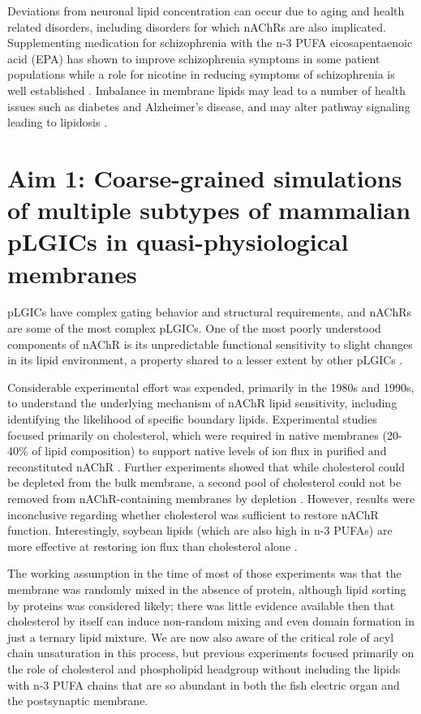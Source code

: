 \documentclass{article}
\begin{document}
Deviations from neuronal lipid concentration can occur due to aging and health related disorders, including disorders for which nAChRs are also implicated. Supplementing medication for schizophrenia with the n-3 PUFA eicosapentaenoic acid (EPA) has shown to improve schizophrenia symptoms in some patient populations \cite{Peet2003,Freemantle2006,Su2003} while a role for nicotine in reducing symptoms of schizophrenia is well established \cite{Picciotto2008}. Imbalance in membrane lipids may lead to a number of health issues such as diabetes and Alzheimer’s disease, and may alter pathway signaling leading to lipidosis \cite{Escriba2017,Laforet2010,Yadav2014}.

\section{Aim 1: Coarse-grained simulations of multiple subtypes of mammalian pLGICs in quasi-physiological membranes}

pLGICs have complex gating behavior and structural requirements, and nAChRs are some of the most complex pLGICs. One of the most poorly understood components of nAChR is its unpredictable functional sensitivity to slight changes in its lipid environment, a property shared to a lesser extent by other pLGICs \cite{M.CriadoH.Eibl1982,Conti2013}.

Considerable experimental effort \cite{Fong_Correlation_1986,Sunshine_Lipid_1992,Hamouda_Assessing_2006,Butler_FTIR_1993,Bhushan_Correlation_1993,Fong_Stabilization_1987,Corrie_Lipid_2002} was expended, primarily in the 1980s and 1990s, to understand the underlying mechanism of nAChR lipid sensitivity, including identifying the likelihood of specific boundary lipids. Experimental studies focused primarily on cholesterol, which were required in native membranes (20-40\% of lipid composition) to support native levels of ion flux in purified and reconstituted nAChR \cite{Fong_Correlation_1986,Fong_Stabilization_1987}. Further experiments showed that while cholesterol could be depleted from the bulk membrane, a second pool of cholesterol could not be removed from nAChR-containing membranes by depletion \cite{Leibel1987}. However, results were inconclusive regarding whether cholesterol was sufficient to restore nAChR function. Interestingly, soybean lipids (which are also high in n-3 PUFAs) \cite{Yoshida1986,Regost2003,Olsen2003} are more effective at restoring ion flux than cholesterol alone \cite{Morales2006}.

The working assumption in the time of most of those experiments was that the membrane was randomly mixed in the absence of protein, although lipid sorting by proteins was considered likely; there was little evidence available then that cholesterol by itself can induce non-random mixing and even domain formation in just a ternary lipid mixture. We are now also aware of the critical role of acyl chain unsaturation in this process, but previous experiments focused primarily on the role of cholesterol and phospholipid headgroup without including the lipids with n-3 PUFA chains that are so abundant in both the fish electric organ and the postsynaptic membrane.
\end{document}
